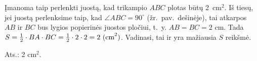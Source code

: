 \documentclass[11pt,a4paper]{article}
\newcommand{\hm}[1]{\nobreak\hspace{0pt}#1\nobreak\hspace{0pt}}
\begin{document}
Įmanoma taip perlenkti juostą, kad trikampio $ABC$ plotas būtų 2~cm$^2$. Iš tiesų, jei juostą perlenksime taip, kad $\angle ABC = 90^{\circ}$ (žr.~pav.~dešinėje), tai atkarpos $AB$ ir $BC$ bus lygios 
popierinės juostos pločiui, t.~y. $AB=BC=2$ cm. Tada $S=\frac{1}{2}\cdot BA\cdot BC\hm= \frac{1}{2} \cdot 2\cdot 2 =2 \text{ (cm}^2)$. Vadinasi, tai ir yra mažiausia $S$ reikšmė.

\begin{flushright}
     Ats.: 2 cm$^2$.
\end{flushright}

\vspace{0,7cm}
\end{document}
